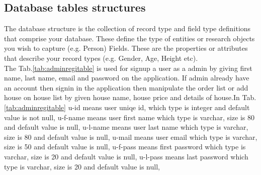\documentclass[12pt,a4paper]{report}
\newcommand\tab[1][0cm]{\hspace*{#1}}
\begin{document}
	


	\subsection{Database tables structures}
	\tab The database structure is the collection of record type and field type definitions that comprise your database. These define the type of entities or research objects you wish to capture (e.g. Person) Fields. These are the properties or attributes that describe your record types (e.g. Gender, Age, Height etc).\\
		\tab The Tab.\ref{tab:adminregitable} is used for signup a user as a admin by giving first name, last name, email and password on the application. If admin already have an account then signin in the application then manipulate the order list or add house on house list by given house name, house price and details of house.In Tab.\ref{tab:adminregitable} u-id means user uniqe id, which type is integer and default value is not null, u-f-name means user first name which type is varchar, size is 80 and default value is null, u-l-name means user last name which type is varchar, size is 80 and default value is null, u-mail means user email which type is varchar, size is 50 and default value is null, u-f-pass means first password which type is varchar, size is 20 and default value is null, u-l-pass means last password which type is varchar, size is 20 and default value is null, 
\end{document}
